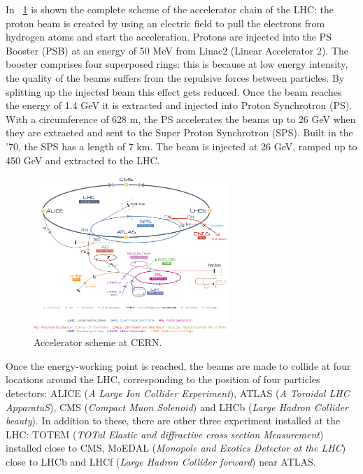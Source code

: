In \figurename~\ref{Cern-Accelerator-Complex}  is shown the complete scheme of the accelerator chain of the LHC: the proton beam is created by using an electric field to pull the electrons from hydrogen atoms and start the acceleration. Protons are injected into the PS Booster (PSB) at an  energy of 50 MeV from Linac2 (Linear Accelerator 2). The booster comprises four superposed rings: this is because at low energy intensity, the quality of the beams suffers from the repulsive forces between particles. By splitting up the injected beam this effect gets reduced. Once the beam reaches the energy of 1.4 GeV it is extracted and injected into Proton Synchrotron (PS). With a circumference of 628 m, the PS accelerates the beams up to 26 GeV when they are extracted and sent to the Super Proton Synchrotron (SPS). Built in the '70, the SPS has a length of 7 km. The beam is injected at 26 GeV, ramped up to 450 GeV and extracted to the LHC. \\%
\begin{figure}[htbp]
\centering
\includegraphics[width=0.65\textwidth]{Images/Cern-Accelerator-Complex}
\caption{Accelerator scheme at CERN.}
\label{Cern-Accelerator-Complex}
\end{figure}
Once the energy-working point is reached, the beams are made to collide at four locations around the LHC, corresponding to the position of four particles detectors: ALICE (\emph{A Large Ion Collider Experiment}), ATLAS (\emph{A Toroidal LHC ApparatuS}), CMS (\emph{Compact Muon Solenoid}) and LHCb (\emph{Large Hadron Collider beauty}). In addition to these, there are other three experiment installed at the LHC: TOTEM (\textit{TOTal Elastic and diffractive cross section Measurement}) installed close to CMS, MoEDAL (\textit{Monopole and Exotics Detector at the LHC}) close to LHCb and LHCf (\textit{Large Hadron Collider forward}) near ATLAS. \\

